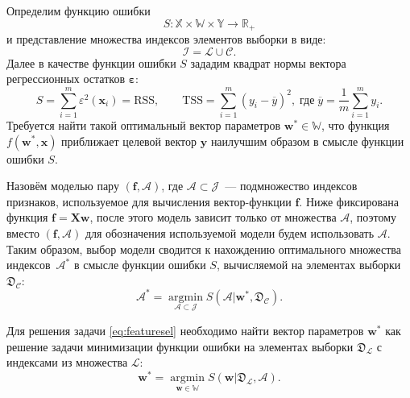 \documentclass[a4paper,12pt]{article}
\newcommand{\bx}{\mathbf{x}}
\newcommand{\bw}{\mathbf{w}}
\newcommand{\by}{\mathbf{y}}
\newcommand{\bX}{\mathbf{X}}
\newcommand{\calJ}{\mathcal{J}}
\newcommand{\calA}{\mathcal{A}}
\newcommand{\frakD}{\mathfrak{D}}
\newcommand{\rss}{\mathrm{RSS}}
\newcommand{\tss}{\mathrm{TSS}}
\theoremstyle{plain}
\begin{document}
Определим функцию ошибки 
\begin{equation*}
S: \mathbb{X} \times \mathbb{W} \times \mathbb{Y} \rightarrow \mathbb{R}_+
\end{equation*}
и представление множества индексов элементов выборки в виде: 
\begin{equation*}
\mathcal{I} = \mathcal{L} \cup \mathcal{C}.
\label{eq:learntest}
\end{equation*}
Далее в качестве функции ошибки $S$ зададим квадрат нормы вектора регрессионных остатков $\boldsymbol{\varepsilon}$:
\begin{equation}
S = \sum\limits_{i = 1}^m \varepsilon^2(\bx_i) = \rss, \qquad \tss = \sum\limits_{i = 1}^m (y_i - \overline{y})^2, \; \text{где} \; \overline{y} = \frac{1}{m}\sum\limits_{i = 1}^m y_i.
\label{eq:error}
\end{equation} 
Требуется найти такой оптимальный вектор параметров $\bw^* \in \mathbb{W}$, что функция $f(\bw^*, \bx)$ приближает целевой вектор $\by$ наилучшим образом в смысле функции ошибки $S$. 

Назовём моделью пару $(\mathbf{f}, \calA)$, где $\calA \subset \calJ$~--- подмножество индексов признаков, используемое для вычисления вектор-функции $\mathbf{f}$. Ниже фиксирована функция $\mathbf{f} = \bX \bw$, после этого модель зависит только от множества $\calA$, поэтому вместо $(\mathbf{f}, \calA)$ для обозначения используемой модели будем использовать $\calA$. Таким образом, выбор модели сводится к нахождению оптимального множества индексов~$\calA^*$ в смысле функции ошибки $S$, вычисляемой на элементах выборки $\frakD_{\mathcal{C}}$:
\begin{equation}
\mathcal{A^*} = \mathop{\arg\min}\limits_{\mathcal{A} \subset \mathcal{J}} S(\mathcal{A} | \bw^*, \frakD_{\mathcal{C}}).
\label{eq:featuresel}
\end{equation}

Для решения задачи \eqref{eq:featuresel} необходимо найти вектор параметров $\bw^*$ 
как решение задачи минимизации функции ошибки на элементах выборки $\frakD_{\mathcal{L}}$ с индексами из множества $\mathcal{L}$:
\begin{equation}
\bw^* = \mathop{\arg\min}\limits_{\bw \in \mathbb{W}} S(\bw | \frakD_{\mathcal{L}}, \mathcal{A}).
\label{eq:optim_par}
\end{equation} 
\end{document}
